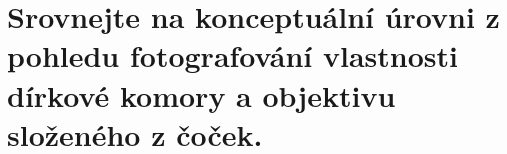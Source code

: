 \section{Srovnejte na konceptuální úrovni z pohledu fotografování vlastnosti dírkové komory a objektivu složeného z 
čoček.}